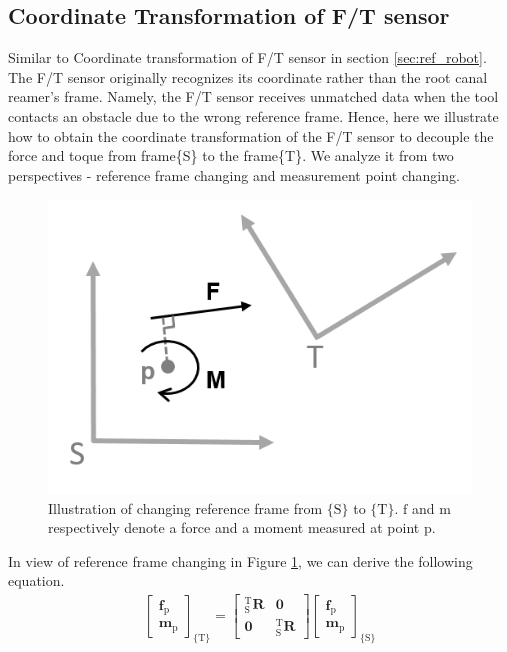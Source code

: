 \subsection{Coordinate Transformation of F/T sensor}
\label{sec:rfc}
Similar to Coordinate transformation of F/T sensor in section \ref{sec:ref_robot}. The F/T sensor originally recognizes its coordinate rather than the root canal reamer's frame. Namely, the F/T sensor receives unmatched data when the tool contacts an obstacle due to the wrong reference frame. Hence, here we illustrate how to obtain the coordinate transformation of the F/T sensor to decouple the force and toque from frame\{S\} to the frame\{T\}. We analyze it from two perspectives - reference frame changing and measurement point changing.
\par
\begin{figure}[htbp]
\begin{center}
\includegraphics[width=0.7\linewidth]{Images/sensor_comp 1.png}
\caption{
Illustration of changing reference frame from $\{\mathrm{S}\} $ to $\{\mathrm{T}\}$. $\mathrm{f}$ and $\mathrm{m}$ respectively denote a force and a moment measured at point p.
}\label{fig:sensor_comp1}
\end{center}
\end{figure}
\par\noindent
In view of reference frame changing in Figure \ref{fig:sensor_comp1}, we can derive the following equation.
\begin{equation}
\begin{split}
\begin{bmatrix}
\boldsymbol{f}_\mathrm{p}\\ 
\boldsymbol{m}_\mathrm{p}
\end{bmatrix}
_{\{ \mathrm{T}\}}
=
\begin{bmatrix}
_\mathrm{S}^\mathrm{T}\mathbf{R} & \boldsymbol{0}\\ 
\boldsymbol{0} & _\mathrm{S}^\mathrm{T}\mathbf{R}
\end{bmatrix}
\begin{bmatrix}
\boldsymbol{f}_\mathrm{p}\\ 
\boldsymbol{m}_\mathrm{p}
\end{bmatrix}
_{\{ \mathrm{S}\}}
\end{split}
\end{equation}
